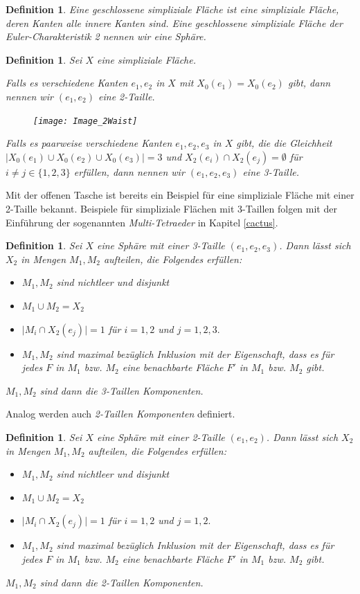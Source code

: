 \documentclass[12pt,titlepage,twoside,cleardoublepage]{article}
\theoremstyle{nummermitklammern}
\newtheorem{definition}[temp]{Definition}
\newtheorem{definition}[zahl]{Definition}
\numberwithin{equation}{section}
\begin{document}
\begin{definition}  Eine \emph{geschlossene} simpliziale Fläche ist eine simpliziale Fläche, deren Kanten alle innere Kanten sind. Eine geschlossene simpliziale Fläche der Euler-Charakteristik  2 nennen wir eine \emph{Sphäre}.
\end{definition} 

\begin{definition}
Sei $X$ eine simpliziale Fläche.

 Falls es verschiedene Kanten $e_1,e_2$ in $X$ mit $X_0(e_1)=X_0(e_2)$ gibt, dann nennen wir $(e_1,e_2)$ eine 2-Taille.
 \begin{figure}[H]
\begin{center}
\texttt{[image: Image\_2Waist]}
\end{center}
\end{figure} 
 Falls es paarweise verschiedene Kanten $e_1,e_2,e_3$ in $X$ gibt, die die Gleichheit $\vert X_0(e_1)\cup X_0(e_2)\cup X_0(e_3) \vert=3$ und $X_2(e_i)\cap X_2(e_j)=\emptyset$ für $i \neq j\in\{1,2,3\}  $ erfüllen, dann nennen wir $(e_1,e_2,e_3)$ eine 3-Taille. 
\end{definition}
Mit der offenen Tasche ist bereits ein Beispiel für eine simpliziale Fläche mit einer 2-Taille bekannt. Beispiele für simpliziale Flächen mit 3-Taillen folgen mit der Einführung der sogenannten \emph{Multi-Tetraeder} in Kapitel \ref{cactus}. 
\begin{definition} \label{2waistk}
Sei $X$ eine Sphäre mit einer 3-Taille $(e_1,e_2,e_3)$. Dann lässt sich $X_2$ in  Mengen $M_1,M_2$ aufteilen, die Folgendes erfüllen:
\begin{itemize}
\item $M_1,M_2$ sind nichtleer und disjunkt
\item $M_1\cup M_2=X_2$
\item $\vert M_i \cap X_2(e_j)\vert =1$ für $i=1,2$ und $j=1,2,3.$
\item $M_1,M_2$ sind maximal bezüglich Inklusion mit der Eigenschaft, dass es für jedes $F$ in $M_1$ bzw. $M_2$ eine benachbarte Fläche $F'$ in $M_1$ bzw. $M_2$ gibt.
\end{itemize}  
 $M_1,M_2$ sind dann die \emph{3-Taillen Komponenten}. 
\end{definition}
Analog werden auch \emph{2-Taillen Komponenten} definiert.
\begin{definition}
Sei $X$ eine Sphäre mit einer 2-Taille $(e_1,e_2)$. Dann lässt sich $X_2$ in  Mengen $M_1,M_2$ aufteilen, die Folgendes erfüllen:
\begin{itemize}
\item $M_1,M_2$ sind nichtleer und disjunkt
\item $M_1\cup M_2=X_2$
\item $\vert M_i \cap X_2(e_j)\vert =1$ für $i=1,2$ und $j=1,2.$
\item $M_1,M_2$ sind maximal bezüglich Inklusion mit der Eigenschaft, dass es für jedes $F$ in $M_1$ bzw. $M_2$ eine benachbarte Fläche $F'$ in $M_1$ bzw. $M_2$ gibt.
\end{itemize}  
 $M_1,M_2$ sind dann die \emph{2-Taillen Komponenten}. 
\end{definition}
\end{document}
